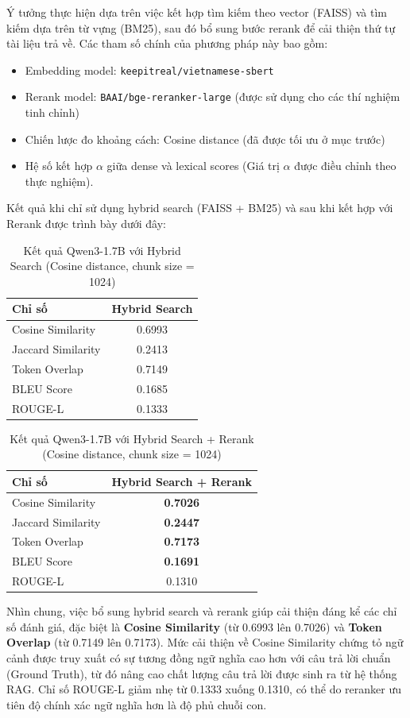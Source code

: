 Ý tưởng thực hiện dựa trên việc kết hợp tìm kiếm theo vector (FAISS) và tìm kiếm dựa trên từ vựng (BM25), sau đó bổ sung bước rerank để cải thiện thứ tự tài liệu
trả về. Các tham số chính của phương pháp này bao gồm:
 
\begin{itemize}
    \item Embedding model: \texttt{keepitreal/vietnamese-sbert}
    \item Rerank model: \texttt{BAAI/bge-reranker-large} (được sử dụng cho các thí nghiệm tinh chỉnh)
    \item Chiến lược đo khoảng cách: Cosine distance (đã được tối ưu ở mục trước)
    \item Hệ số kết hợp $\alpha$ giữa dense và lexical scores (Giá trị $\alpha$ được điều chỉnh theo thực nghiệm).
\end{itemize}
 
Kết quả khi chỉ sử dụng hybrid search (FAISS + BM25) và sau khi kết hợp với Rerank được
trình bày dưới đây:
 
\begin{table}[h!]
\centering
\caption{Kết quả Qwen3-1.7B với Hybrid Search (Cosine distance, chunk size = 1024)}
\begin{tabular}{|l|c|}
\hline
\textbf{Chỉ số} & \textbf{Hybrid Search} \\
\hline
Cosine Similarity   & 0.6993 \\
Jaccard Similarity  & 0.2413 \\
Token Overlap       & 0.7149 \\
BLEU Score          & 0.1685 \\
ROUGE-L             & 0.1333 \\
\hline
\end{tabular}
\end{table}
 
\begin{table}[h!]
\centering
\caption{Kết quả Qwen3-1.7B với Hybrid Search + Rerank (Cosine distance, chunk size = 1024)}
\begin{tabular}{|l|c|}
\hline
\textbf{Chỉ số} & \textbf{Hybrid Search + Rerank} \\
\hline
Cosine Similarity   & \textbf{0.7026} \\
Jaccard Similarity  & \textbf{0.2447} \\
Token Overlap       & \textbf{0.7173} \\
BLEU Score          & \textbf{0.1691} \\
ROUGE-L             & 0.1310 \\
\hline
\end{tabular}
\end{table}
 
Nhìn chung, việc bổ sung hybrid search và rerank giúp cải thiện đáng kể các chỉ số đánh giá,
đặc biệt là \textbf{Cosine Similarity} (từ 0.6993 lên 0.7026) và \textbf{Token Overlap} (từ 0.7149 lên 0.7173).
Mức cải thiện về Cosine Similarity chứng tỏ ngữ cảnh được truy xuất có sự tương đồng ngữ
nghĩa cao hơn với câu trả lời chuẩn (Ground Truth), từ đó nâng cao chất lượng câu trả lời được
sinh ra từ hệ thống RAG. Chỉ số ROUGE-L giảm nhẹ từ 0.1333 xuống 0.1310, có thể do reranker ưu tiên độ chính xác ngữ nghĩa hơn là độ phủ chuỗi con.